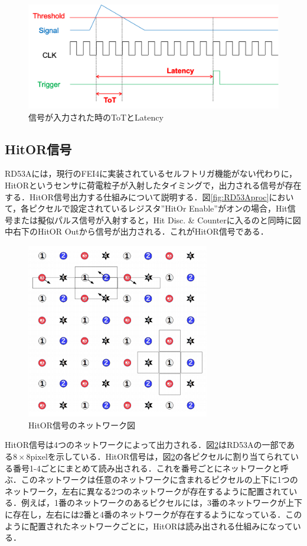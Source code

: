 \begin{figure}[h]
  \centering
  \includegraphics[width=13cm]{./figure/tot.png}
  \caption{信号が入力された時のToTとLatency}
  \label{fig:tot}
\end{figure}



\subsection{HitOR信号}
RD53Aには，現行のFEI4に実装されているセルフトリガ機能がない代わりに，HitORというセンサに荷電粒子が入射したタイミングで，出力される信号が存在する．HitOR信号出力する仕組みについて説明する．図\ref{fig:RD53Aproc}において，各ピクセルで設定されているレジスタ''HitOr Enable''がオンの場合，Hit信号または擬似パルス信号が入射すると，Hit Disc. \& Counterに入るのと同時に図中右下のHitOR Outから信号が出力される．これがHitOR信号である．\par

\begin{figure}[h]
  \centering
  \includegraphics[width=8cm]{./figure/HitOR.png}
  \caption{HitOR信号のネットワーク図\cite{Garcia-Sciveres:2287593}}
  \label{fig:HitOR}
\end{figure}

HitOR信号は4つのネットワークによって出力される．図\ref{fig:HitOR}はRD53Aの一部である$8 \times 8 \mathrm{pixel}$を示している．HitOR信号は，図\ref{fig:HitOR}の各ピクセルに割り当てられている番号1-4ごとにまとめて読み出される．これを番号ごとにネットワークと呼ぶ．このネットワークは任意のネットワークに含まれるピクセルの上下に1つのネットワーク，左右に異なる2つのネットワークが存在するように配置されている．例えば，1番のネットワークのあるピクセルには，3番のネットワークが上下に存在し，左右には2番と4番のネットワークが存在するようになっている．このように配置されたネットワークごとに，HitORは読み出される仕組みになっている．

